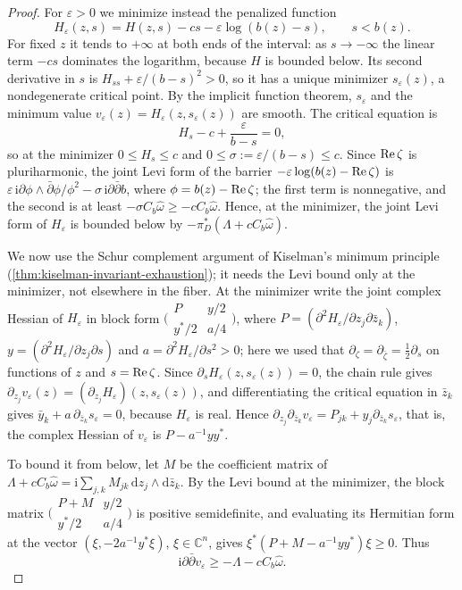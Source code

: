 \begin{proof}
For $\varepsilon>0$ we minimize instead the penalized function
\[
 H_\varepsilon(z,s)=H(z,s)-cs-\varepsilon\log(b(z)-s),\qquad s<b(z).
\]
For fixed $z$ it tends to $+\infty$ at both ends of the interval: as $s\to-\infty$ the linear term $-cs$ dominates the logarithm, because $H$ is bounded below. Its second derivative in $s$ is $H_{ss}+\varepsilon/(b-s)^2>0$, so it has a unique minimizer $s_\varepsilon(z)$, a nondegenerate critical point. By the implicit function theorem, $s_\varepsilon$ and the minimum value $v_\varepsilon(z)=H_\varepsilon(z,s_\varepsilon(z))$ are smooth. The critical equation is
\[
 H_s-c+\frac\varepsilon{b-s}=0,
\]
so at the minimizer $0\leq H_s\leq c$ and $0\leq\sigma:=\varepsilon/(b-s)\leq c$. Since $\operatorname{Re}\zeta$ is pluriharmonic, the joint Levi form of the barrier $-\varepsilon\log(b(z)-\operatorname{Re}\zeta)$ is $\varepsilon\,\mathrm i\partial\phi\wedge\bar\partial\phi/\phi^2-\sigma\,\mathrm i\partial\bar\partial b$, where $\phi=b(z)-\operatorname{Re}\zeta$; the first term is nonnegative, and the second is at least $-\sigma C_b\widehat\omega\geq-cC_b\widehat\omega$. Hence, at the minimizer, the joint Levi form of $H_\varepsilon$ is bounded below by $-\pi_D^*(\Lambda+cC_b\widehat\omega)$.

We now use the Schur complement argument of Kiselman's minimum principle (\cref{thm:kiselman-invariant-exhaustion}); it needs the Levi bound only at the minimizer, not elsewhere in the fiber. At the minimizer write the joint complex Hessian of $H_\varepsilon$ in block form $\bigl(\begin{smallmatrix}P&y/2\\y^*/2&a/4\end{smallmatrix}\bigr)$, where $P=(\partial^2H_\varepsilon/\partial z_j\partial\bar z_k)$, $y=(\partial^2H_\varepsilon/\partial z_j\partial s)$ and $a=\partial^2H_\varepsilon/\partial s^2>0$; here we used that $\partial_\zeta=\partial_{\bar\zeta}=\frac12\partial_s$ on functions of $z$ and $s=\operatorname{Re}\zeta$. Since $\partial_sH_\varepsilon(z,s_\varepsilon(z))=0$, the chain rule gives $\partial_{z_j}v_\varepsilon(z)=(\partial_{z_j}H_\varepsilon)(z,s_\varepsilon(z))$, and differentiating the critical equation in $\bar z_k$ gives $\bar y_k+a\,\partial_{\bar z_k}s_\varepsilon=0$, because $H_\varepsilon$ is real. Hence $\partial_{z_j}\partial_{\bar z_k}v_\varepsilon=P_{jk}+y_j\partial_{\bar z_k}s_\varepsilon$, that is, the complex Hessian of $v_\varepsilon$ is $P-a^{-1}yy^*$.

To bound it from below, let $M$ be the coefficient matrix of $\Lambda+cC_b\widehat\omega=\mathrm i\sum_{j,k}M_{jk}\,\mathrm dz_j\wedge\mathrm d\bar z_k$. By the Levi bound at the minimizer, the block matrix $\bigl(\begin{smallmatrix}P+M&y/2\\y^*/2&a/4\end{smallmatrix}\bigr)$ is positive semidefinite, and evaluating its Hermitian form at the vector $(\xi,-2a^{-1}y^*\xi)$, $\xi\in\mathbb C^n$, gives $\xi^*(P+M-a^{-1}yy^*)\xi\geq0$. Thus
\[
 \mathrm i\partial\bar\partial v_\varepsilon
                                  \geq-\Lambda-cC_b\widehat\omega.
\]


\end{proof}

